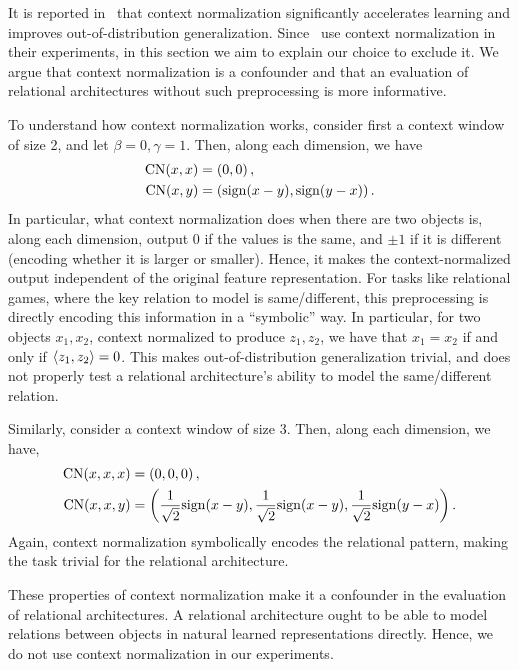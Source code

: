 It is reported in~\citep{webbEmergentSymbols2021,kergNeuralArchitecture2022} that context normalization significantly accelerates learning and improves out-of-distribution generalization. Since~\citep{webbEmergentSymbols2021,kergNeuralArchitecture2022} use context normalization in their experiments, in this section we aim to explain our choice to exclude it. We argue that context normalization is a confounder and that an evaluation of relational architectures without such preprocessing is more informative.

To understand how context normalization works, consider first a context window of size 2, and let $\beta = 0, \gamma = 1$. Then, along each dimension, we have
\begin{align*}
        \mathrm{CN}(x, x) &= \left(0, 0\right),\\
        \mathrm{CN}(x, y) &= \left(\mathrm{sign}(x - y), \mathrm{sign}(y - x)\right).
\end{align*}
In particular, what context normalization does when there are two objects is, along each dimension, output 0 if the values is the same, and $\pm 1$ if it is different (encoding whether it is larger or smaller). Hence, it makes the context-normalized output independent of the original feature representation. For tasks like relational games, where the key relation to model is same/different, this preprocessing is directly encoding this information in a ``symbolic'' way. In particular, for two objects $x_1, x_2$, context normalized to produce $z_1, z_2$, we have that $x_1 = x_2$ if and only if $\left \langle z_1, z_2 \right\rangle = 0$. This makes out-of-distribution generalization trivial, and does not properly test a relational architecture's ability to model the same/different relation.

Similarly, consider a context window of size 3. Then, along each dimension, we have,
\begin{align*}
        \mathrm{CN}(x, x, x) &= \left(0, 0, 0\right),\\
        \mathrm{CN}(x, x, y) &= \left(\frac{1}{\sqrt{2}} \mathrm{sign}(x - y), \frac{1}{\sqrt{2}} \mathrm{sign}(x - y), \frac{1}{\sqrt{2}} \mathrm{sign}(y - x)\right).
\end{align*}
Again, context normalization symbolically encodes the relational pattern, making the task trivial for the relational architecture.

These properties of context normalization make it a confounder in the evaluation of relational architectures. A relational architecture ought to be able to model relations between objects in natural learned representations directly. Hence, we do not use context normalization in our experiments.